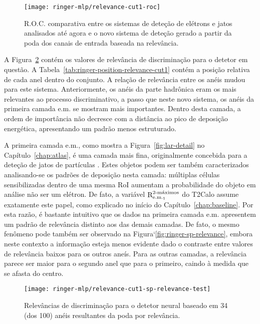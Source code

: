 \begin{figure}
\begin{center}
\texttt{[image: ringer-mlp/relevance-cut1-roc]}
\end{center}
\caption{R.O.C. comparativa entre os sistemas de deteção de elétrons e jatos
analisados até agora e o novo sistema de deteção gerado a partir da poda dos
canais de entrada baseada na relevância.}
\label{fig:relev-cut1-roc}
\end{figure}

A Figura~\ref{fig:relevance-cut1-sp-relevance} contém os valores de relevância
de discriminação para o detetor em questão. A
Tabela~\ref{tab:ringer-position-relevance-cut1} contém a posição relativa de
cada anel dentro do conjunto. A relação de relevância entre os anéis mudou
para este sistema. Anteriormente, os anéis da parte hadrônica eram os mais
relevantes ao processo discriminativo, a passo que neste novo sistema, os
anéis da primeira camada e.m. se mostram mais importantes. Dentro desta
camada, a ordem de importância não decresce com a distância ao pico de
deposição energética, apresentando um padrão menos estruturado.

A primeira camada e.m., como mostra a Figura~\ref{fig:lar-detail} no
Capítulo~\ref{chap:atlas}, é uma camada mais fina, originalmente concebida
para a deteção de jatos de partículas \cite{lar-tdr}. Estes objetos podem ser
também caracterizados analisando-se os padrões de deposição nesta camada:
múltiplas células sensibilizadas dentro de uma mesma RoI aumentam a
probabilidade do objeto em análise não ser um elétron. De fato, a variável
$\eratio$ do T2Calo assume exatamente este papel, como explicado no início do
Capítulo~\ref{chap:baseline}. Por esta razão, é bastante intuitivo que os
dados na primeira camada e.m. apresentem um padrão de relevância distinto aos
das demais camadas. De fato, o mesmo fenômeno pode também ser observado na
Figura`\ref{fig:ringer-sp-relevance}, embora neste contexto a informação
esteja menos evidente dado o contraste entre valores de relevância baixos para
os outros aneís. Para as outras camadas, a relevância parece ser maior para o
segundo anel que para o primeiro, caindo à medida que se afasta do centro.

\begin{figure}
\begin{center}
\texttt{[image: ringer-mlp/relevance-cut1-sp-relevance-test]}
\end{center}
\caption{Relevâncias de discriminação para o detetor neural baseado em 34 (dos
100) anéis resultantes da poda por relev\^{a}ncia.}
\label{fig:relevance-cut1-sp-relevance}
\end{figure}

